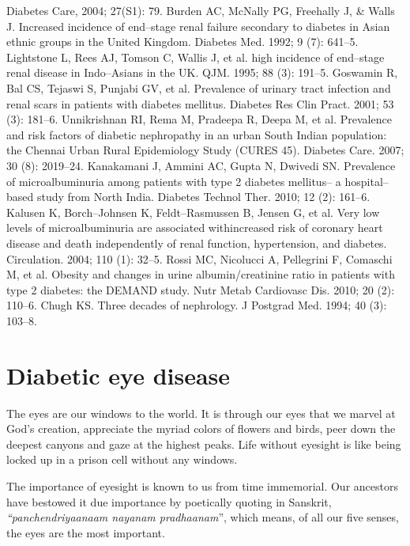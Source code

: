 \begin{thebibliography}{99}
 Diabetes Care, 2004; 27(S1): 79.
 Burden AC, McNally PG, Freehally J, \& Walls J. Increased incidence of end–stage renal failure secondary to diabetes in Asian ethnic groups in the United Kingdom. Diabetes Med. 1992; 9 (7): 641–5.
 Lightstone L, Rees AJ, Tomson C, Wallis J, et al. high incidence of end–stage renal disease in Indo–Asians in the UK. QJM. 1995; 88 (3): 191–5.
 Goswamin R, Bal CS, Tejaswi S, Punjabi GV, et al. Prevalence of urinary tract infection and renal scars in patients with diabetes mellitus. Diabetes Res Clin Pract. 2001; 53 (3): 181–6.
 Unnikrishnan RI, Rema M, Pradeepa R, Deepa M, et al. Prevalence and risk factors of diabetic nephropathy in an urban South Indian population: the Chennai Urban Rural Epidemiology Study (CURES 45). Diabetes Care. 2007; 30 (8): 2019–24.
 Kanakamani J, Ammini AC, Gupta N, Dwivedi SN. Prevalence of microalbuminuria among patients with type 2 diabetes mellitus– a hospital–based study from North India. Diabetes Technol Ther. 2010; 12 (2): 161–6.
 Kalusen K, Borch–Johnsen K, Feldt–Rasmussen B, Jensen G, et al. Very low levels of microalbuminuria are associated with\break increased risk of coronary heart disease and death independently of renal function, hypertension, and diabetes. Circulation. 2004; 110 (1): 32–5.
 Rossi MC, Nicolucci A, Pellegrini F, Comaschi M, et al. Obesity and changes in urine albumin/creatinine ratio in patients with type 2 diabetes: the DEMAND study. Nutr Metab Cardiovasc Dis. 2010; 20 (2): 110–6.
 Chugh KS. Three decades of nephrology. J Postgrad Med. 1994; 40 (3): 103–8.
\end{thebibliography}

\renewcommand{\thechapter}{\arabic{chapter}}
\chapter{Diabetic eye disease}\label{chap15}

The eyes are our windows to the world. It is through our eyes that we marvel at God’s creation, appreciate the myriad colors of flowers and birds, peer down the deepest canyons and gaze at the highest peaks. Life without eyesight is like being locked up in a prison cell without any windows.

The importance of eyesight is known to us from time immemorial. Our ancestors have bestowed it due importance by poetically quoting in Sanskrit, \textit{“panchendriyaanaam nayanam pradhaanam}”, which means, of all our five senses, the eyes are the most important.

